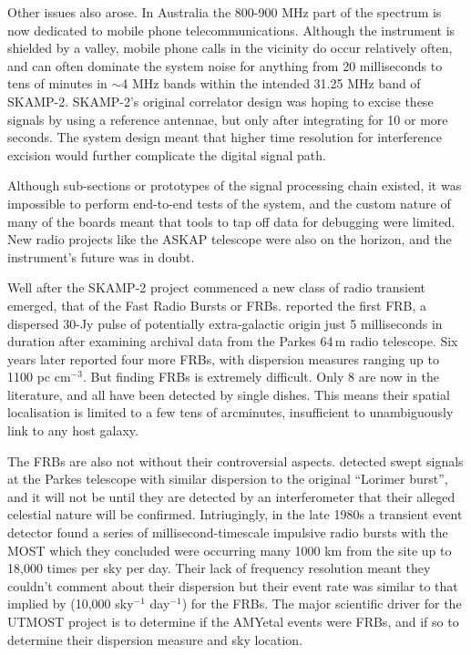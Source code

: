 Other issues also arose. In Australia the 800-900 MHz part of the spectrum is now dedicated to mobile phone telecommunications. Although the instrument is shielded by a valley, mobile phone calls in the vicinity do occur relatively often, and can often dominate the system noise for anything from 20 milliseconds to tens of minutes in $\sim$4 MHz bands within the intended 31.25 MHz band of SKAMP-2. SKAMP-2's original correlator design was hoping to excise these signals by using a reference antennae, but only after integrating for 10 or more seconds. The system design meant that higher time resolution for interference excision would further complicate the digital signal path. 

Although sub-sections or prototypes of the signal processing chain existed, it was impossible to perform end-to-end tests of the system, and the custom nature of many of the boards meant that tools to tap off data for debugging were limited.  New radio projects like the ASKAP telescope were also on the horizon, and the instrument's future was in doubt.

Well after the SKAMP-2 project commenced a new class of radio transient emerged, that of the Fast Radio Bursts or FRBs. \cite{Lorimer_2007} reported the first FRB, a dispersed 30-Jy pulse of potentially extra-galactic origin just 5 milliseconds in duration after examining archival data from the Parkes 64\,m radio telescope. Six years later \citep{Thornton_2013} reported four more FRBs, with dispersion measures ranging up to 1100 pc cm$^{-3}$. But finding FRBs is extremely difficult. Only 8 are now in the literature, and all have been detected by single dishes. This means their spatial localisation is limited to a few tens of arcminutes, insufficient to unambiguously link to any host galaxy.

The FRBs are also not without their controversial aspects. \cite{Burke_Spolaor_2011} detected swept signals at the Parkes telescope with similar dispersion to the original ``Lorimer burst'', and it will not be until they are detected by an interferometer that their alleged celestial nature will be confirmed. Intriugingly, in the late 1980s a transient event detector found a series of millisecond-timescale impulsive radio bursts with the MOST which they concluded were occurring many 1000 km from the site up to 18,000 times per sky per day\cite{AMY}. Their lack of frequency resolution meant they couldn't comment about their dispersion but their event rate was similar to that implied by \citep{Thornton_2013} (10,000 sky$^{-1}$ day$^{-1}$) for the FRBs. The major scientific driver for the UTMOST project is to determine if the AMYetal events were FRBs, and if so to determine their dispersion measure and sky location.

